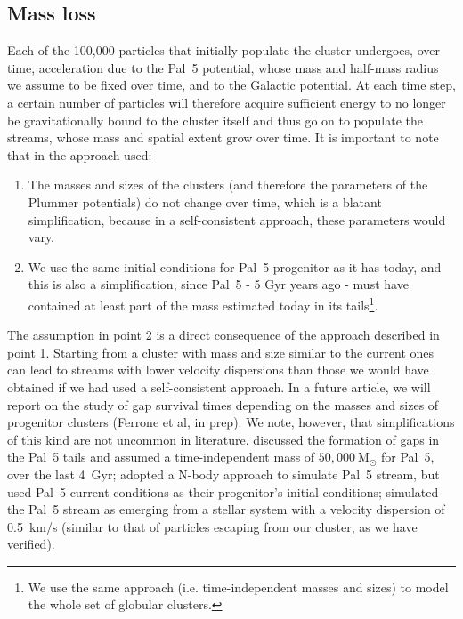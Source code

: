 \documentclass{aa}
\begin{document}
\subsection{Mass loss}\label{sec:mass_loss}

Each of the 100,000 particles that initially populate the cluster undergoes, over time, acceleration due to the Pal~5 potential, whose mass and half-mass radius we assume to be fixed over time, and to the Galactic potential. At each time step, a certain number of particles will therefore acquire sufficient energy to no longer be gravitationally bound to the cluster itself and thus go on to populate the streams, whose mass and spatial extent grow over time. It is important to note that in the approach used:

\begin{enumerate}
    \item The masses and sizes of the clusters (and therefore the parameters of the Plummer potentials) do not change over time, which is a blatant simplification, because in a self-consistent approach, these parameters would vary. 
    \item We use the same initial conditions for Pal~5 progenitor as it has today, and this is also a simplification, since Pal~5 - 5 Gyr years ago - must have contained at least part of the mass estimated today in its tails\footnote{We use the same approach (i.e. time-independent masses and sizes) to model the whole set of globular clusters.}. 
\end{enumerate}

The assumption in point 2 is a direct consequence of the approach described in point 1. Starting from a cluster with mass and size similar to the current ones can lead to streams with lower velocity dispersions than those we would have obtained if we had used a self-consistent approach. In a future article, we will report on the study of gap survival times depending on the masses and sizes of progenitor clusters (Ferrone et al, in prep). We note, however, that simplifications of this kind are not uncommon in literature. \citet{2017NatAs...1..633P} discussed the formation of gaps in the Pal~5 tails and assumed a time-independent mass of $50,000 ~\textrm{M}_\odot$ for Pal~5, over the last 4~Gyr; \citet{2017MNRAS.470...60E} adopted a N-body approach to simulate Pal~5 stream, but used Pal~5 current conditions as their progenitor's initial conditions; \citet{2019MNRAS.484.2009B} simulated the Pal~5 stream as emerging from a stellar system with a velocity dispersion of 0.5~km/s (similar to that of particles escaping from our cluster, as we have verified). 
\end{document}
